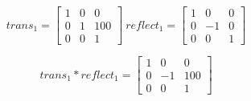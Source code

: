 \documentclass[10pt]{article}
\begin{document}
\[
  trans_1 =
  \begin{bmatrix}
    1 & 0 & 0 \\
    0 & 1 & 100 \\
    0 & 0 & 1
  \end{bmatrix}
  \ reflect_1 =
  \begin{bmatrix}
    1 &  0 & 0 \\
    0 & -1 & 0 \\
    0 &  0 & 1
  \end{bmatrix}
\]

\[
  trans_1 * reflect_1 =
  \begin{bmatrix}
    1 &  0 & 0 \\
    0 & -1 & 100 \\
    0 &  0 & 1
  \end{bmatrix}
\]
\end{document}
